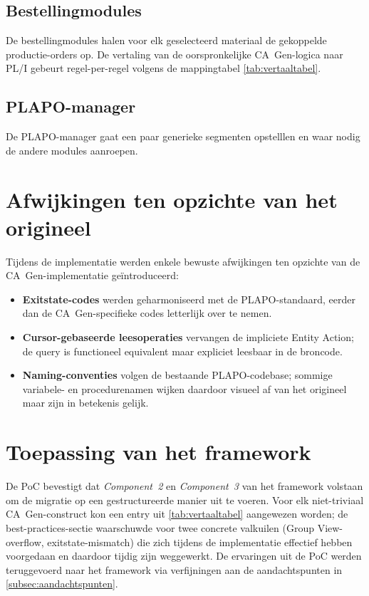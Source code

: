 \subsection{Bestellingmodules}
\label{subsec:poc-bestelling}

De bestellingmodules halen voor elk geselecteerd materiaal de gekoppelde productie-orders op. De vertaling van de oorspronkelijke CA~Gen-logica naar
PL/I gebeurt regel-per-regel volgens de mappingtabel \autoref{tab:vertaaltabel}.

\subsection{PLAPO-manager}
\label{subsec:poc-output}

De PLAPO-manager gaat een paar generieke segmenten opstelllen en waar nodig de andere modules aanroepen.

\section{Afwijkingen ten opzichte van het origineel}
\label{sec:poc-afwijkingen}

Tijdens de implementatie werden enkele bewuste afwijkingen ten opzichte van de CA~Gen-implementatie
ge\"introduceerd:
\begin{itemize}
    \item \textbf{Exitstate-codes} werden geharmoniseerd met de PLAPO-standaard, eerder dan de CA~Gen-specifieke
    codes letterlijk over te nemen.
    \item \textbf{Cursor-gebaseerde leesoperaties} vervangen de impliciete Entity Action; de query is functioneel
    equivalent maar expliciet leesbaar in de broncode.
    \item \textbf{Naming-conventies} volgen de bestaande PLAPO-codebase; sommige variabele- en procedurenamen
    wijken daardoor visueel af van het origineel maar zijn in betekenis gelijk.
\end{itemize}

\section{Toepassing van het framework}
\label{sec:poc-toepassing-framework}

De PoC bevestigt dat \emph{Component~2} en \emph{Component~3} van het framework volstaan om de migratie
op een gestructureerde manier uit te voeren. Voor elk niet-triviaal CA~Gen-construct kon een entry uit
\autoref{tab:vertaaltabel} aangewezen worden; de best-practices-sectie waarschuwde voor twee concrete
valkuilen (Group View-overflow, exitstate-mismatch) die zich tijdens de implementatie effectief hebben
voorgedaan en daardoor tijdig zijn weggewerkt. De ervaringen uit de PoC werden teruggevoerd naar het
framework via verfijningen aan de aandachtspunten in \autoref{subsec:aandachtspunten}.